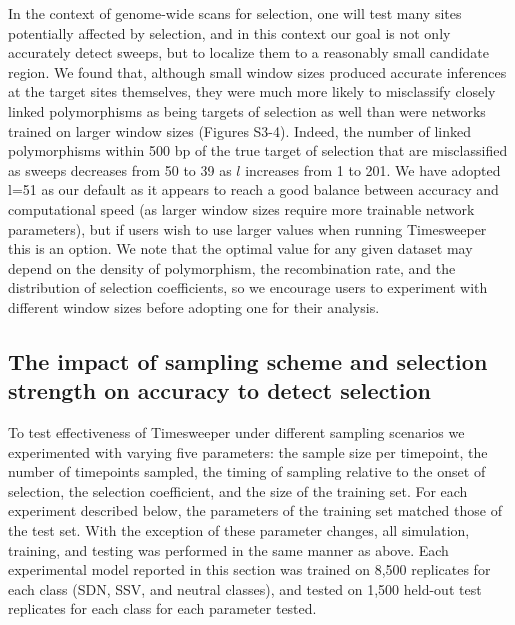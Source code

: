 In the context of genome-wide scans for selection, one will test many sites potentially affected by selection, and in this context our goal is not only accurately detect sweeps, but to localize them to a reasonably small candidate region. We found that, although small window sizes produced accurate inferences at the target sites themselves, they were much more likely to misclassify closely linked polymorphisms as being targets of selection as well than were networks trained on larger window sizes (Figures S3-4). Indeed, the number of linked polymorphisms within 500 bp of the true target of selection that are misclassified as sweeps decreases from 50 to 39 as $l$ increases from 1 to 201. We have adopted l=51 as our default as it appears to reach a good balance between accuracy and computational speed (as larger window sizes require more trainable network parameters), but if users wish to use larger values when running Timesweeper this is an option. We note that the optimal value for any given dataset may depend on the density of polymorphism, the recombination rate, and the distribution of selection coefficients, so we encourage users to experiment with different window sizes before adopting one for their analysis.  \\

\subsection{The impact of sampling scheme and selection strength on accuracy to detect selection}

To test effectiveness of Timesweeper under different sampling scenarios we experimented with varying five parameters: the sample size per timepoint, the number of timepoints sampled, the timing of sampling relative to the onset of selection, the selection coefficient, and the size of the training set. For each experiment described below, the parameters of the training set matched those of the test set. With the exception of these parameter changes, all simulation, training, and testing was performed in the same manner as above. Each experimental model reported in this section was trained on 8,500 replicates for each class (SDN, SSV, and neutral classes), and tested on 1,500 held-out test replicates for each class for each parameter tested. \\

